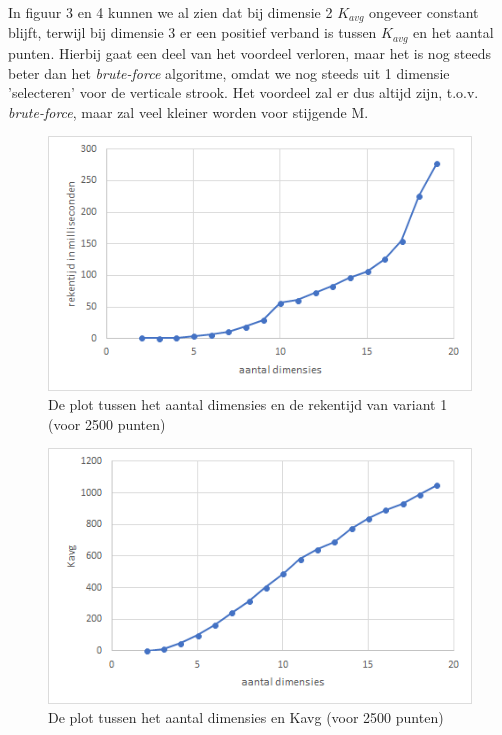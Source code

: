 \documentclass[12pt]{article}
\begin{document}
In figuur 3 en 4 kunnen we al zien dat bij dimensie 2 $K_{avg}$ ongeveer constant blijft, terwijl bij dimensie 3 er een positief verband is tussen $K_{avg}$ en het aantal punten.
Hierbij gaat een deel van het voordeel verloren, maar het is nog steeds beter dan het \textit{brute-force} algoritme, omdat we nog steeds uit 1 dimensie 'selecteren' voor de verticale strook.
Het voordeel zal er dus altijd zijn, t.o.v. \textit{brute-force}, maar zal veel kleiner worden voor stijgende M.

\begin{figure}
\includegraphics[width=\textwidth]{dim-var1-rekentijd.png}
\caption{De plot tussen het aantal dimensies en de rekentijd van variant 1 (voor 2500 punten)}
\end{figure}

\begin{figure}
\includegraphics[width=\textwidth]{dim-Kavg.png}
\caption{De plot tussen het aantal dimensies en Kavg (voor 2500 punten)}
\end{figure}
\end{document}
